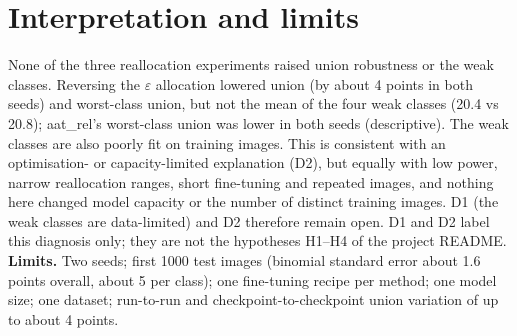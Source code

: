 \documentclass[11pt]{article}
\begin{document}
\section{Interpretation and limits}
None of the three reallocation experiments raised union robustness or the weak classes. Reversing the $\varepsilon$ allocation lowered union (by about 4 points in both seeds) and worst-class union, but not the mean of the four weak classes (20.4 vs 20.8); aat\_rel's worst-class union was lower in both seeds (descriptive). The weak classes are also poorly fit on training images. This is consistent with an optimisation- or
capacity-limited explanation (D2), but equally with low power, narrow reallocation ranges, short fine-tuning and repeated images, and nothing here
changed model capacity or the number of distinct training images. D1 (the weak classes are data-limited) and D2 therefore remain open. D1 and D2
label this diagnosis only; they are not the hypotheses H1--H4 of the project README.\\
\textbf{Limits.} Two seeds; first 1000 test images (binomial standard error about 1.6 points overall, about 5 per class); one fine-tuning
recipe per method; one model size; one dataset; run-to-run and checkpoint-to-checkpoint union variation of up to about 4 points.
\end{document}
